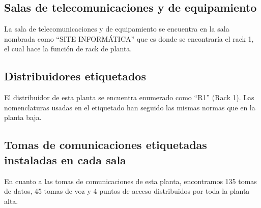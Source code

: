 \subsection{Salas de telecomunicaciones y de equipamiento}
La sala de telecomunicaciones y de equipamiento se encuentra en la sala nombrada como ``SITE INFORMÁTICA'' que es donde se encontraría el rack 1, el cual hace la función de rack de planta.

\subsection{Distribuidores etiquetados}
El distribuidor de esta planta se encuentra enumerado como ``R1'' (Rack 1). Las nomenclaturas usadas en el etiquetado han seguido las mismas normas que en la planta baja.

\subsection{Tomas de comunicaciones etiquetadas instaladas en cada sala}
En cuanto a las tomas de comunicaciones de esta planta, encontramos 135 tomas de datos, 45 tomas de voz y 4 puntos de acceso distribuidos por toda la planta alta.
